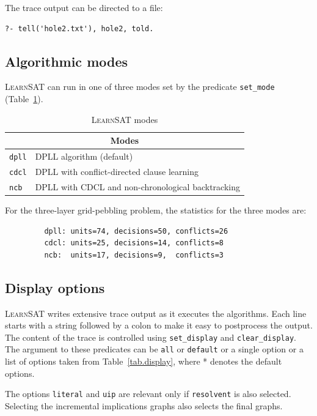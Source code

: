 \documentclass[11pt]{report}
\newcommand*{\p}[1]{\textup{\texttt{#1}}}
\newcommand*{\ls}{\textsc{LearnSAT}}
\begin{document}
The trace output can be directed to a file:

\begin{verbatim}
?- tell('hole2.txt'), hole2, told.
\end{verbatim}

\newpage

\subsection{Algorithmic modes}

\ls{} can run in one of three modes set by the predicate \p{set\_mode}
(Table~\ref{tab.modes}).

\begin{table}[*hb]
\begin{center}
\begin{tabular}{|l|l|}
\hline
\multicolumn{2}{|c|}{\textbf{\large Modes}}\\
\hline
\p{dpll} & DPLL algorithm (default)\\
\p{cdcl} & DPLL with conflict-directed clause learning\\
\p{ncb} &  DPLL with CDCL and non-chronological backtracking\\
\hline
\end{tabular}
\caption{\ls{} modes}\label{tab.modes}
\end{center}
\end{table}


For the three-layer grid-pebbling problem, the statistics for the three
modes are:
\begin{verbatim}
         dpll: units=74, decisions=50, conflicts=26
         cdcl: units=25, decisions=14, conflicts=8
         ncb:  units=17, decisions=9,  conflicts=3
\end{verbatim}
\subsection{Display options}

\ls{} writes extensive trace output as it executes the algorithms. Each
line starts with a string followed by a colon to make it easy to
postprocess the output. The content of the trace is controlled using
\p{set\_display} and \p{clear\_display}. The argument to these
predicates can be \p{all} or \p{default} or a single option or a list of
options taken from Table~\ref{tab.display}, where * denotes the default
options.

The options \p{literal} and \p{uip} are relevant only if \p{resolvent}
is also selected. Selecting the incremental implications graphs also
selects the final graphs.
\end{document}
